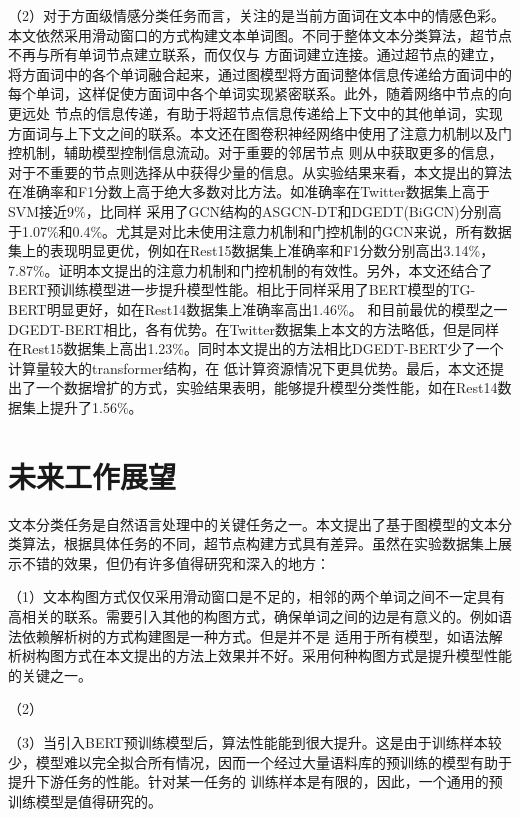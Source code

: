 （2）对于方面级情感分类任务而言，关注的是当前方面词在文本中的情感色彩。本文依然采用滑动窗口的方式构建文本单词图。不同于整体文本分类算法，超节点不再与所有单词节点建立联系，而仅仅与
方面词建立连接。通过超节点的建立，将方面词中的各个单词融合起来，通过图模型将方面词整体信息传递给方面词中的每个单词，这样促使方面词中各个单词实现紧密联系。此外，随着网络中节点的向更远处
节点的信息传递，有助于将超节点信息传递给上下文中的其他单词，实现方面词与上下文之间的联系。本文还在图卷积神经网络中使用了注意力机制以及门控机制，辅助模型控制信息流动。对于重要的邻居节点
则从中获取更多的信息，对于不重要的节点则选择从中获得少量的信息。从实验结果来看，本文提出的算法在准确率和F1分数上高于绝大多数对比方法。如准确率在Twitter数据集上高于SVM接近9\%，比同样
采用了GCN结构的ASGCN-DT和DGEDT(BiGCN)分别高于1.07\%和0.4\%。尤其是对比未使用注意力机制和门控机制的GCN来说，所有数据集上的表现明显更优，例如在Rest15数据集上准确率和F1分数分别高出3.14\%，
7.87\%。证明本文提出的注意力机制和门控机制的有效性。另外，本文还结合了BERT预训练模型进一步提升模型性能。相比于同样采用了BERT模型的TG-BERT明显更好，如在Rest14数据集上准确率高出1.46\%。
和目前最优的模型之一DGEDT-BERT相比，各有优势。在Twitter数据集上本文的方法略低，但是同样在Rest15数据集上高出1.23\%。同时本文提出的方法相比DGEDT-BERT少了一个计算量较大的transformer结构，在
低计算资源情况下更具优势。最后，本文还提出了一个数据增扩的方式，实验结果表明，能够提升模型分类性能，如在Rest14数据集上提升了1.56\%。

\section{未来工作展望}
文本分类任务是自然语言处理中的关键任务之一。本文提出了基于图模型的文本分类算法，根据具体任务的不同，超节点构建方式具有差异。虽然在实验数据集上展示不错的效果，但仍有许多值得研究和深入的地方：

（1）文本构图方式仅仅采用滑动窗口是不足的，相邻的两个单词之间不一定具有高相关的联系。需要引入其他的构图方式，确保单词之间的边是有意义的。例如语法依赖解析树的方式构建图是一种方式。但是并不是
适用于所有模型，如语法解析树构图方式在本文提出的方法上效果并不好。采用何种构图方式是提升模型性能的关键之一。

（2）

（3）当引入BERT预训练模型后，算法性能能到很大提升。这是由于训练样本较少，模型难以完全拟合所有情况，因而一个经过大量语料库的预训练的模型有助于提升下游任务的性能。针对某一任务的
训练样本是有限的，因此，一个通用的预训练模型是值得研究的。


